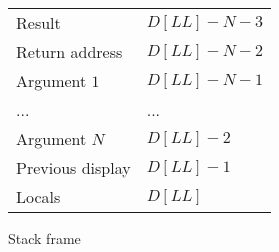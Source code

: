 \documentclass[oneside]{amsart}
\theoremstyle{definition}
\theoremstyle{remark}
\numberwithin{equation}{section}
\begin{document}
\begin{figure}[h]
\caption{Stack frame}
\begin{tabular}{l|l}
Result & $D[LL] - N - 3$ \\
Return address & $D[LL] - N - 2$  \\
Argument $1$ & $D[LL] - N - 1$  \\
... & ... \\
Argument $N$ & $D[LL] - 2$ \\
Previous display & $D[LL] - 1$ \\
Locals & $D[LL]$ \\
\end{tabular}
\label{fig:frame}
\end{figure}

\end{document}
